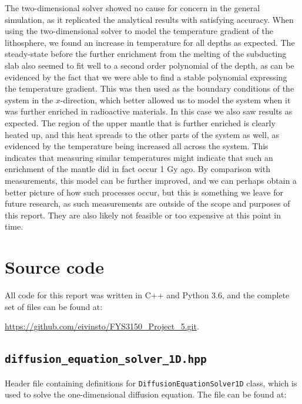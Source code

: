 \documentclass[reprint,english,notitlepage]{revtex4-1}  %
\begin{document}
The two-dimensional solver showed no cause for concern in the general simulation, as it replicated the analytical results with satisfying accuracy. When using the two-dimensional solver to model the temperature gradient of the lithosphere, we found an increase in temperature for all depths as expected. The steady-state before the further enrichment from the melting of the subducting slab also seemed to fit well to a second order polynomial of the depth, as can be evidenced by the fact that we were able to find a stable polynomial expressing the temperature gradient. This was then used as the boundary conditions of the system in the $x$-direction, which better allowed us to model the system when it was further enriched in radioactive materials. In this case we also saw results as expected. The region of the upper mantle that is further enriched is clearly heated up, and this heat spreads to the other parts of the system as well, as evidenced by the temperature being increased all across the system. This indicates that measuring similar temperatures might indicate that such an enrichment of the mantle did in fact occur 1 Gy ago. By comparison with measurements, this model can be further improved, and we can perhaps obtain a better picture of how such processes occur, but this is something we leave for future research, as such measurements are outside of the scope and purposes of this report. They are also likely not feasible or too expensive at this point in time. 



   

\onecolumngrid
{}
\newpage
\twocolumngrid

\appendix
\section{Source code} \label{A}
All code for this report was written in C++ and Python 3.6, and the complete set of files can be found at:

\url{https://github.com/eivinsto/FYS3150_Project_5.git}.

\cprotect\subsection{\verb+diffusion_equation_solver_1D.hpp+} \label{A.1}

Header file containing definitions for \verb+DiffusionEquationSolver1D+ class, which is used to solve the one-dimensional diffusion equation. The file can be found at:
\end{document}
